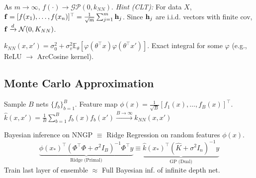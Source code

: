 \begin{theorem}
    As \(m \to \infty\), \(f(\cdot) \to \mathcal{GP}(0, k_{NN})\).
    \textit{Hint (CLT):} For data \(X\), \(\vb{f} = [f(x_1), \dots, f(x_n)]^\top = \frac{1}{\sqrt{m}} \sum_{j=1}^m \vb{h}_j\). Since \(\vb{h}_j\) are i.i.d. vectors with finite cov, \(\vb{f} \xrightarrow{d} \mathcal{N}(0, K_{NN})\).
\end{theorem}

\begin{definition}
    \(k_{NN}(x, x') = \sigma_0^2 + \sigma_v^2 \mathbb{E}_{\theta}[\varphi(\theta^\top x) \varphi(\theta^\top x')]\).
    Exact integral for some \(\varphi\) (e.g., ReLU \(\to\) ArcCosine kernel).
\end{definition}

\subsection{Monte Carlo Approximation}
\begin{definition}
    Sample \(B\) nets \(\{f_b\}_{b=1}^B\). Feature map \(\phi(x) = \frac{1}{\sqrt{B}}[f_1(x), \dots, f_B(x)]^\top\).
    \( \hat{k}(x, x') = \frac{1}{B} \sum_{b=1}^B f_b(x) f_b(x') \xrightarrow{B \to \infty} k_{NN}(x, x') \)
\end{definition}

\begin{corollary}
    Bayesian inference on NNGP \(\equiv\) Ridge Regression on random features \(\phi(x)\).
    \[ \underbrace{\phi(x_*)^\top (\Phi^\top \Phi + \sigma^2 I_B)^{-1} \Phi^\top y}_{\text{Ridge (Primal)}} \equiv \underbrace{\hat{k}(x_*)^\top (\hat{K} + \sigma^2 I_n)^{-1} y}_{\text{GP (Dual)}} \]
    Train last layer of ensemble \(\approx\) Full Bayesian inf. of infinite depth net.
\end{corollary}